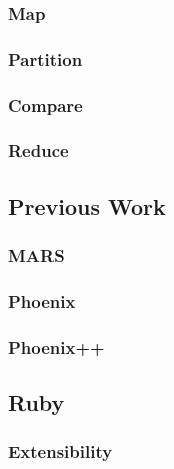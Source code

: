 \subsubsection{Map}
\subsubsection{Partition}
\subsubsection{Compare}
\subsubsection{Reduce}
\subsection{Previous Work}
\subsubsection{MARS}
\subsubsection{Phoenix}
\subsubsection{Phoenix++}
\subsection{Ruby}
\subsubsection{Extensibility}

